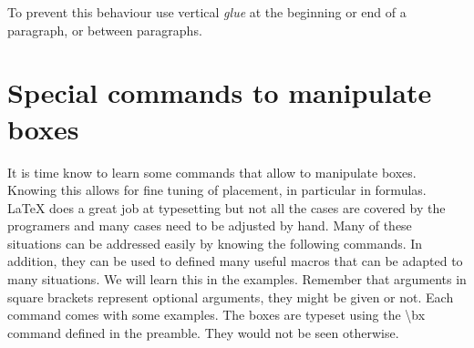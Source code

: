 \documentclass[a4paper]{article}
\newcommand{\bs}[1]{{\rmfamily\color{blue}\textbackslash{}#1}}
\begin{document}
To prevent this behaviour use vertical \emph{glue} at the beginning or end of a paragraph, or between paragraphs.


\section{Special commands to manipulate boxes}

It is time know to learn some commands that allow to manipulate boxes. Knowing this allows for fine tuning of placement, in particular in formulas. \LaTeX{} does a great job at typesetting but not all the cases are covered by the programers and many cases need to be adjusted by hand. Many of these situations can be addressed easily by knowing the following commands. In addition, they can be used to defined many useful macros that can be adapted to many situations. We will learn this in the examples. Remember that arguments in square brackets represent optional arguments, they might be given or not.  Each command comes with some examples. The boxes are typeset using the \bs{bx} command defined in the preamble. They would not be seen otherwise.
\end{document}
